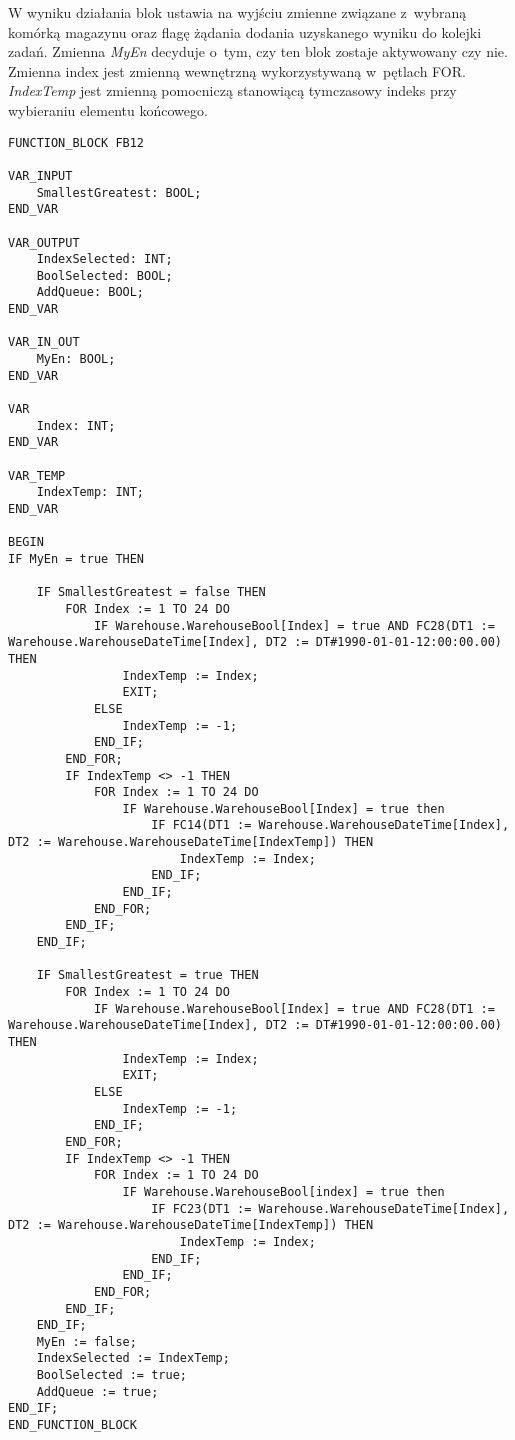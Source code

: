 W wyniku działania blok ustawia na wyjściu zmienne związane z~wybraną komórką magazynu oraz flagę żądania dodania uzyskanego wyniku do kolejki zadań. Zmienna \emph{MyEn} decyduje o~tym, czy ten blok zostaje aktywowany czy nie. Zmienna index jest zmienną wewnętrzną wykorzystywaną w~pętlach FOR. \emph{IndexTemp} jest zmienną pomocniczą stanowiącą tymczasowy indeks przy wybieraniu elementu końcowego.
\begin{lstlisting}[caption={FB12 - Funkcja wybiera najmłodszą lub najstarszą zajętą komórkę}]
FUNCTION_BLOCK FB12

VAR_INPUT
    SmallestGreatest: BOOL;
END_VAR 

VAR_OUTPUT
    IndexSelected: INT;
    BoolSelected: BOOL;
    AddQueue: BOOL;    
END_VAR
 
VAR_IN_OUT
    MyEn: BOOL;
END_VAR  
 
VAR
    Index: INT;
END_VAR
    
VAR_TEMP
    IndexTemp: INT;
END_VAR 
       
BEGIN
IF MyEn = true THEN    
    
    IF SmallestGreatest = false THEN    
        FOR Index := 1 TO 24 DO        
            IF Warehouse.WarehouseBool[Index] = true AND FC28(DT1 := Warehouse.WarehouseDateTime[Index], DT2 := DT#1990-01-01-12:00:00.00) THEN
                IndexTemp := Index;
                EXIT;
            ELSE
                IndexTemp := -1;
            END_IF;
        END_FOR;  
        IF IndexTemp <> -1 THEN                   
            FOR Index := 1 TO 24 DO        
                IF Warehouse.WarehouseBool[Index] = true then
                    IF FC14(DT1 := Warehouse.WarehouseDateTime[Index], DT2 := Warehouse.WarehouseDateTime[IndexTemp]) THEN
                        IndexTemp := Index;            
                    END_IF;
                END_IF;
            END_FOR;        
        END_IF;           
    END_IF;
    
    IF SmallestGreatest = true THEN
        FOR Index := 1 TO 24 DO        
            IF Warehouse.WarehouseBool[Index] = true AND FC28(DT1 := Warehouse.WarehouseDateTime[Index], DT2 := DT#1990-01-01-12:00:00.00) THEN
                IndexTemp := Index;
                EXIT;
            ELSE
                IndexTemp := -1;
            END_IF;
        END_FOR;      
        IF IndexTemp <> -1 THEN                   
            FOR Index := 1 TO 24 DO
                IF Warehouse.WarehouseBool[index] = true then        
                    IF FC23(DT1 := Warehouse.WarehouseDateTime[Index], DT2 := Warehouse.WarehouseDateTime[IndexTemp]) THEN
                        IndexTemp := Index;
                    END_IF;            
                END_IF;            
            END_FOR;
        END_IF;            
    END_IF;
    MyEn := false;
    IndexSelected := IndexTemp;
    BoolSelected := true;
    AddQueue := true;
END_IF;    
END_FUNCTION_BLOCK
\end{lstlisting}
